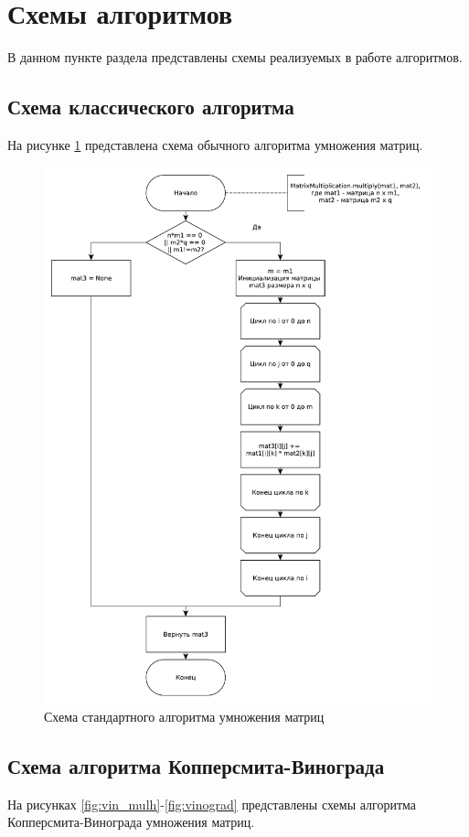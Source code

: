 \documentclass[a4paper,oneside,14pt]{extreport}
\begin{document}
\section{Схемы алгоритмов}
В данном пункте раздела представлены схемы реализуемых в работе алгоритмов.
\subsection{Схема классического алгоритма}
На рисунке \ref{fig:matmult} представлена схема обычного алгоритма умножения матриц.

\begin{figure}[H]
	\centering
	\includegraphics[width=1\linewidth]{images/MatrixMultiplication}
	\caption{Схема стандартного алгоритма умножения матриц}
	\label{fig:matmult}
\end{figure}

\subsection{Схема алгоритма Копперсмита-Винограда}
На рисунках \ref{fig:vin_mulh}-\ref{fig:vinograd} представлены схемы алгоритма Копперсмита-Винограда умножения матриц.
\end{document}
